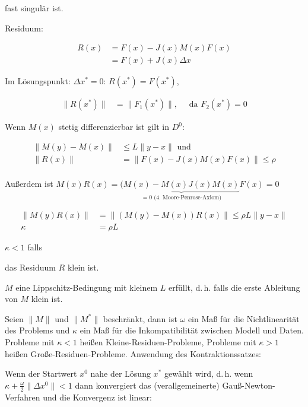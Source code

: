 fast singulär ist.

Residuum:

\begin{align*}
R(x) &= F(x) - J(x) M(x) F(x) \\
&= F(x) + J(x)\Delta x
\end{align*}

Im Lösungspunkt: $\Delta x^* = 0$: $R(x^*) = F(x^*)$,

\begin{align*}
\| R(x^*) \| &= \| F_1(x^*) \|, \quad \text{ da } F_2(x^*) = 0
\end{align*}


Wenn $M(x)$ stetig differenzierbar ist gilt in $D^0$:

\begin{align*}
\|M(y) - M(x)\| & \leq L \|y-x\| \text{ und } \\
\|R(x)\| &= \|F(x) - J(x)M(x) F(x) \| \leq \rho \\
\end{align*}

Außerdem ist $M(x) R(x) = (\underbrace{M(x) - M(x)J(x) M(x)}_{= 0 \text{ (4. Moore-Penrose-Axiom)}} F(x) = 0$

\begin{align*}
\| M(y) R(x) \| &= \| (M(y)-M(x)) R(x) \| \leq \rho L \|y-x\| \\
\kappa &= \rho L 
\end{align*}

$\kappa < 1$ falls 

\bitm
\item das Residuum $R$ klein ist.
\item $M$ eine Lippschitz-Bedingung mit kleinem $L$ erfüllt, d.\,h. falls die erste Ableitung von $M$ klein ist.
\eitm


Seien $\|M\|$ und $\|M^*\|$ beschränkt, dann ist $\omega$ ein Maß für die Nichtlinearität des Problems und $\kappa$ ein Maß für die Inkompatibilität zwischen Modell und Daten. Probleme mit $\kappa < 1$ heißen Kleine-Residuen-Probleme, Probleme mit $\kappa > 1$ heißen Große-Residuen-Probleme. Anwendung des Kontraktionssatzes:


Wenn der Startwert $x^0$ nahe der Lösung $x^*$ gewählt wird, d.\,h. wenn $\kappa + \frac \omega 2 \|\Delta x^0\| < 1$ dann konvergiert das (verallgemeinerte) Gauß-Newton-Verfahren  und die Konvergenz ist linear:


